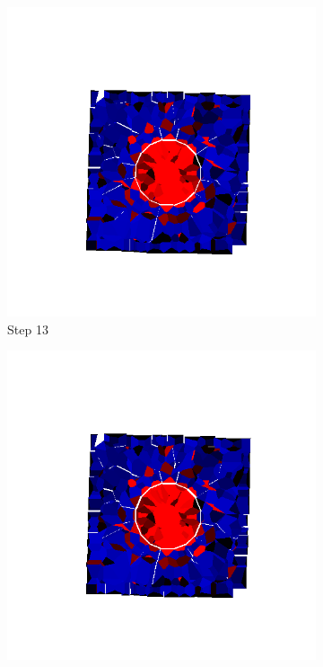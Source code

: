 \begin{figure}[ht!]
      \begin{subfigure}{.25\textwidth}
        \centering
        \includegraphics[width=1.0\linewidth]{Files/Small_ASR/IS/DEP5-STEP(013).png}
      \caption{Step 13}
      \end{subfigure}%
      \begin{subfigure}{.25\textwidth}
        \centering
        \includegraphics[width=1.0\linewidth]{Files/Small_ASR/IS/DEP5-STEP(014).png}

\end{subfigure}
\end{figure}
